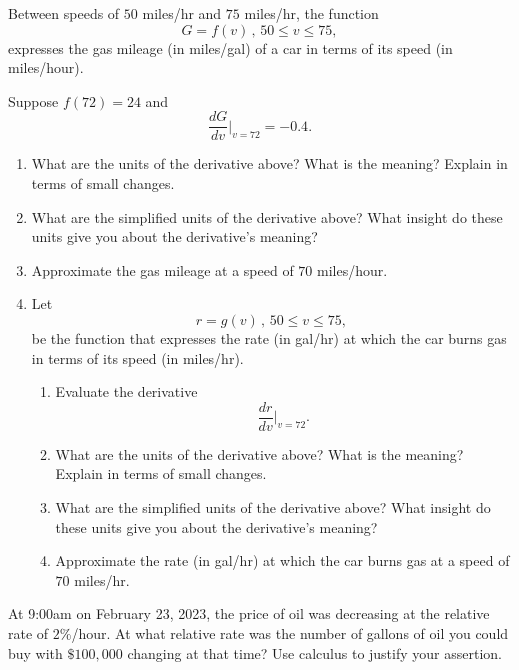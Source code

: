 \documentclass{ximera}
\begin{document}
\begin{exercise}  \label{Qdfbv4trttg}
Between speeds of $50$ miles/hr and $75$ miles/hr, the function
\[
    G = f(v) \, , \, 50 \leq v \leq 75,
\]
expresses the gas mileage (in miles/gal) of a car in terms of its speed (in miles/hour).

Suppose $f(72)=24$ and 
\[
  \frac{dG}{dv}\Big|_{v=72} = -0.4 .
\]

\begin{enumerate}
\item What are the units of the derivative above? What is the meaning? Explain in terms of small changes.

\item What are the simplified units of the derivative above? What insight do these units give you about the derivative's meaning?

\item Approximate the gas mileage at a speed of $70$ miles/hour.

\item Let 
\[
  r=g(v) \, , \, 50 \leq v \leq 75,
\]
be the function that expresses the rate (in gal/hr) at which the car burns gas in terms of its speed (in miles/hr).

\begin{enumerate}  
\item Evaluate the derivative
\[
  \frac{dr}{dv}\Big|_{v=72} .
\]

\item What are the units of the derivative above? What is the meaning? Explain in terms of small changes.

\item What are the simplified units of the derivative above? What insight do these units give you about the derivative's meaning?

\item Approximate the rate (in gal/hr) at which the car burns gas at a speed of $70$ miles/hr.

\end{enumerate}

\end{enumerate}

\end{exercise}


\begin{exercise}  \label{EEdfbygyhnnjjhh}
At 9:00am on February 23, 2023, the price of oil was decreasing at the relative rate of $2\%$/hour. At what relative rate was the number of gallons of oil you could buy with $\$100,000$ changing at that time? Use calculus to justify your assertion. 
\end{exercise}
\end{document}
